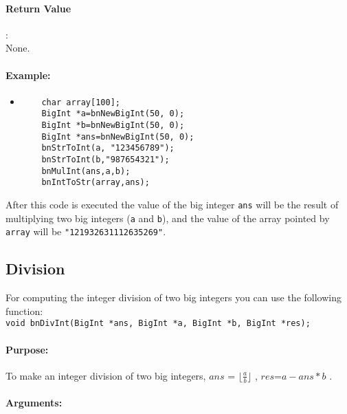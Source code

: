 \documentclass{book}
\begin{document}
\paragraph{Return Value}:\\

None.

\paragraph{Example:}

\begin{itemize}
\item
\begin{verbatim}
    char array[100];
    BigInt *a=bnNewBigInt(50, 0);
    BigInt *b=bnNewBigInt(50, 0);
    BigInt *ans=bnNewBigInt(50, 0);
    bnStrToInt(a, "123456789");
    bnStrToInt(b,"987654321");
    bnMulInt(ans,a,b);
    bnIntToStr(array,ans);
\end{verbatim}
\end{itemize}

After this code is executed the value of the big integer \verb+ans+ will be the result of multiplying two big integers (\verb+a+ and \verb+b+), and the value of the array pointed by \verb+array+ will be \verb+"121932631112635269"+.

\subsection{Division}

For computing the integer division of two big integers you can use the following function:\\

\verb+void bnDivInt(BigInt *ans, BigInt *a, BigInt *b, BigInt *res);+\\

\paragraph{Purpose:} 

To make an integer division of two big integers, $ans$ =  $\lfloor\frac{a}{b}\rfloor$ , $res$=$ a - ans * b$ .

\paragraph{Arguments:}
\end{document}

